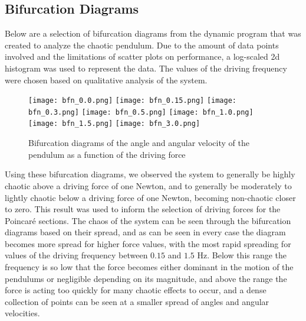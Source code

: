 \documentclass[11pt]{article} %
\begin{document}
    \subsection{Bifurcation Diagrams}
    Below are a selection of bifurcation diagrams from the dynamic program that was created to analyze the chaotic pendulum. Due to the
    amount of data points involved and the limitations of scatter plots on performance, a log-scaled 2d histogram was used to represent the
    data. The values of the driving frequency were chosen based on qualitative analysis of the system.
    \begin{figure}[H]
        \centering
        \texttt{[image: bfn\_0.0.png]}
        \texttt{[image: bfn\_0.15.png]}
        \texttt{[image: bfn\_0.3.png]}
        \texttt{[image: bfn\_0.5.png]}
        \texttt{[image: bfn\_1.0.png]}
        \texttt{[image: bfn\_1.5.png]}
        \texttt{[image: bfn\_3.0.png]}
        \caption{Bifurcation diagrams of the angle and angular velocity of the pendulum as a function of the driving force}
        \label{fig:bifurcation}
    \end{figure}
    Using these bifurcation diagrams, we observed the system to generally be highly chaotic above a driving force of one Newton, and to generally
    be moderately to lightly chaotic below a driving force of one Newton, becoming non-chaotic closer to zero. This result was used to inform
    the selection of driving forces for the Poincar\'e sections. The chaos of the system can be seen through the bifurcation diagrams based on their
    spread, and as can be seen in every case the diagram becomes more spread for higher force values, with the most rapid spreading for values of the
    driving frequency between $0.15$ and $1.5$ Hz. Below this range the frequency is so low that the force becomes either dominant in the motion of the
    pendulums or negligible depending on its magnitude, and above the range the force is acting too quickly for many chaotic effects to occur, and a
    dense collection of points can be seen at a smaller spread of angles and angular velocities.\\
\end{document}
